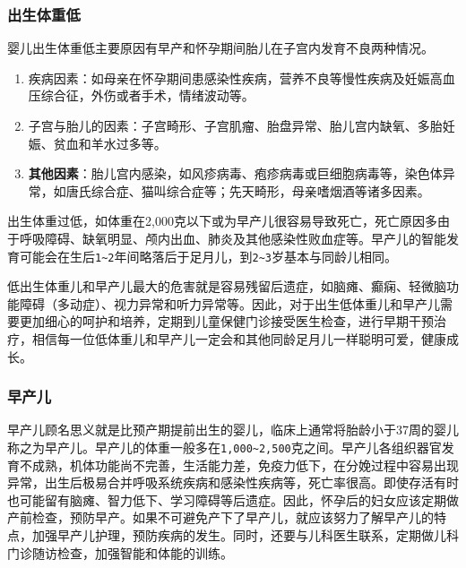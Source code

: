 \subsubsection{出生体重低}%

婴儿出生体重低主要原因有早产和怀孕期间胎儿在子宫内发育不良两种情况。

\begin{enumerate}
\item
  疾病因素：如母亲在怀孕期间患感染性疾病，营养不良等慢性疾病及妊娠高血压综合征，外伤或者手术，情绪波动等。
\item
  子宫与胎儿的因素：子宫畸形、子宫肌瘤、胎盘异常、胎儿宫内缺氧、多胎妊娠、贫血和羊水过多等。
\item
  \textbf{其他因素}：胎儿宫内感染，如风疹病毒、疱疹病毒或巨细胞病毒等，染色体异常，如唐氏综合症、猫叫综合症等；先天畸形，母亲嗜烟酒等诸多因素。
\end{enumerate}

出生体重过低，如体重在2,000克以下或为早产儿很容易导致死亡，死亡原因多由于呼吸障碍、缺氧明显、颅内出血、肺炎及其他感染性败血症等。早产儿的智能发育可能会在生后\texttt{1\textasciitilde{}2}\hspace{0pt}年间略落后于足月儿，到\texttt{2\textasciitilde{}3}\hspace{0pt}岁基本与同龄儿相同。

低出生体重儿和早产儿最大的危害就是容易残留后遗症，如脑瘫、癫痫、轻微脑功能障碍（多动症）、视力异常和听力异常等。因此，对于出生低体重儿和早产儿需要更加细心的呵护和培养，定期到儿童保健门诊接受医生检查，进行早期干预治疗，相信每一位低体重儿和早产儿一定会和其他同龄足月儿一样聪明可爱，健康成长。


\subsubsection{早产儿}%

早产儿顾名思义就是比预产期提前出生的婴儿，临床上通常将胎龄小于37周的婴儿称之为早产儿。早产儿的体重一般多在\texttt{1,000\textasciitilde{}2,500}\hspace{0pt}克之间。早产儿各组织器官发育不成熟，机体功能尚不完善，生活能力差，免疫力低下，在分娩过程中容易出现异常，出生后极易合并呼吸系统疾病和感染性疾病等，死亡率很高。即使存活有时也可能留有脑瘫、智力低下、学习障碍等后遗症。因此，怀孕后的妇女应该定期做产前检查，预防早产。如果不可避免产下了早产儿，就应该努力了解早产儿的特点，加强早产儿护理，预防疾病的发生。同时，还要与儿科医生联系，定期做儿科门诊随访检查，加强智能和体能的训练。

